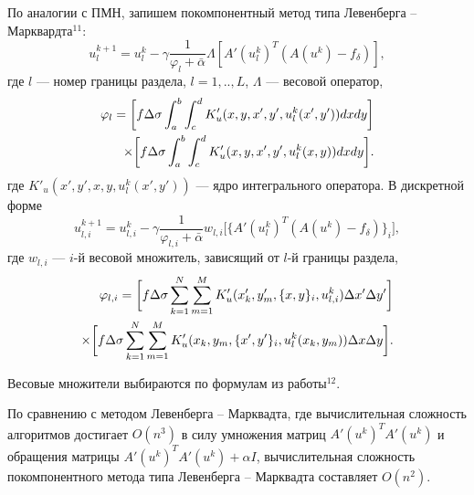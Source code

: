 \documentclass[%
autoref,     %
href,        %
facsimile,   %
colorlinks,  %
]{disser}
\begin{document}
По аналогии с ПМН, запишем покомпонентный метод типа Левенберга -- Марквардта$^{11}$:
$$ u_l^{k+1}=u_l^k-\gamma\frac{1}{\varphi_l+\bar{\alpha}}\Lambda[ A'(u_l^k)^T(A(u^k)-f_\delta)],$$
где $l$ --- номер границы раздела, $l=1,..,L$, $\Lambda$ --- весовой оператор, 
\begin{equation*}
\begin{aligned}
\varphi_l=\bigg[ f\Delta\sigma\int_{a}^{b}\int_{c}^{d}
K'_u(x, y, x', y', u_l^k(x',y'))dxdy\bigg] \notag \\ \times\bigg[f\Delta\sigma\int_{a}^{b}\int_{c}^{d}K'_u(x,y, x',y',u_l^k(x,y))dxdy\bigg]. 
\end{aligned}
\end{equation*} 
где $K'_u(x',y', x, y, u_l^k(x',y'))$ --- ядро интегрального оператора. %
{\scriptsize
\let\thefootnote\relax\let\thefootnote\relax{}}
В дискретной форме
\begin{equation*}\label{comp_lm_meth_disc}
u_{l,i}^{k+1}=u_{l,i}^k-\gamma\frac{1}{\varphi_{l,i}+\bar{\alpha}}w_{l,i}\bigg[ \{A'(u_l^k)^T(A(u^k)-f_\delta)\}_i\bigg],
\end{equation*}
где $w_{l,i}$ --- $i$-й весовой множитель, зависящий от $l$-й границы раздела,
\begin{equation*}
\begin{aligned}
\varphi_{l,i}=\bigg[ f\Delta\sigma\sum\limits_{k=1}^{N}
\sum\limits_{m=1}^{M}
K'_u(x'_k,y'_m, \{x, y\}_i, u_{l,i}^k) \Delta x' \Delta y'\bigg] \notag \\ \times\bigg[f\Delta\sigma\sum\limits_{k=1}^{N}
\sum\limits_{m=1}^{M}K'_u(x_k,y_m, \{x',y'\}_i,u_l^k(x_k,y_m))\Delta x \Delta y\bigg]. 
\end{aligned}
\end{equation*}
{\scriptsizef
\let\thefootnote\relax\let\thefootnote\relax{}}

Весовые множители выбираются по формулам из работы$^{12}$. 

По сравнению с методом Левенберга -- Марквадта, где вычислительная сложность алгоритмов достигает $O(n^3)$ в силу умножения матриц $A'(u^k)^T A'(u^k)$ и обращения матрицы $A'(u^k)^T A'(u^k)+\alpha I$, вычислительная сложность покомпонентного метода типа Левенберга -- Марквадта составляет $O(n^2)$.
\end{document}
